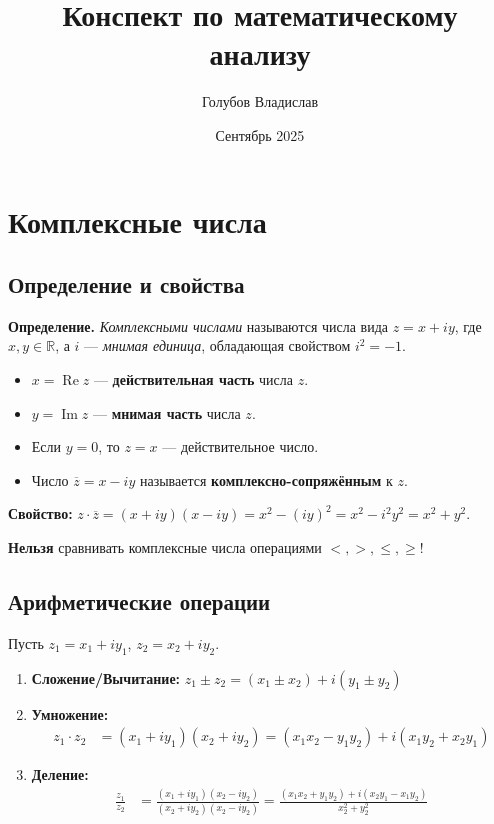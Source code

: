 \documentclass[12pt, a4paper]{article}
\title{Конспект по математическому анализу}
\author{Голубов Владислав}
\date{Сентябрь 2025}
\newcommand{\R}{\mathbb{R}}
\begin{document}
\maketitle
\tableofcontents
\newpage

\section{Комплексные числа}
\subsection{Определение и свойства}
\begin{tcolorbox}
\textbf{Определение.} \textit{Комплексными числами} называются числа вида $z = x + iy$, где $x, y \in \R$, а $i$ — \textit{мнимая единица}, обладающая свойством $i^2 = -1$.
\end{tcolorbox}
\begin{itemize}
    \item $x = \operatorname{Re } z$ — \textbf{действительная часть} числа $z$.
    \item $y = \operatorname{Im } z$ — \textbf{мнимая часть} числа $z$.
    \item Если $y = 0$, то $z = x$ — действительное число.
    \item Число $\overline{z} = x - iy$ называется \textbf{комплексно-сопряжённым} к $z$.
\end{itemize}

\begin{tcolorbox}
\textbf{Свойство:} $z \cdot \overline{z} = (x + iy)(x - iy) = x^2 - (iy)^2 = x^2 - i^2y^2 = x^2 + y^2$.
\end{tcolorbox}

\begin{tcolorbox}[title=Важное примечание]
\textbf{Нельзя} сравнивать комплексные числа операциями $<, >, \leq, \geq$!
\end{tcolorbox}

\subsection{Арифметические операции}
Пусть $z_1 = x_1 + iy_1$, $z_2 = x_2 + iy_2$.
\begin{enumerate}
    \item \textbf{Сложение/Вычитание:}
    $z_1 \pm z_2 = (x_1 \pm x_2) + i(y_1 \pm y_2)$
    \item \textbf{Умножение:}
    \begin{align*}
    z_1 \cdot z_2 &= (x_1 + iy_1)(x_2 + iy_2) = (x_1x_2 - y_1y_2) + i(x_1y_2 + x_2y_1)
    \end{align*}
    \item \textbf{Деление:}
    \begin{align*}
    \frac{z_1}{z_2} &= \frac{(x_1 + iy_1)(x_2 - iy_2)}{(x_2 + iy_2)(x_2 - iy_2)} = \frac{(x_1x_2 + y_1y_2) + i(x_2y_1 - x_1y_2)}{x_2^2 + y_2^2}\\
    \end{align*}
\end{enumerate}
\end{document}
